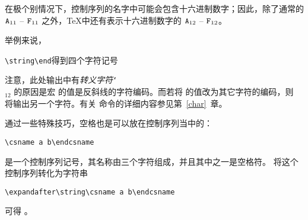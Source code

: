 \documentclass{book}
\begin{document}
在极个别情况下，控制序列的名字中可能会包含十六进制数字；因此，除了通常的 $ \text{{\tt A}}_{11} $ -- $ \text{{\tt F}}_{11} $ 之外，\TeX 中还有表示十六进制数字的 $ \text{{\tt A}}_{12} $ -- $ \text{{\tt F}}_{12} $。

举例来说，
\begin{disp}\verb>\string\end>\quad 得到四个字符记号 \quad{} \end{disp}
注意，此处输出中有\emph{转义字符}\texttt{\char`\\}$_{12}$\label{use:escape} 的原因是宏  的值是反斜线的字符编码。而若将  的值改为其它字符的编码，则  将输出另一个字符。有关  命令的详细内容参见第~\ref{char}~章。

通过一些特殊技巧，空格也是可以放在控制序列当中的：
\begin{disp}\verb>\csname a b\endcsname>\end{disp}
是一个控制序列记号，其名称由三个字符组成，并且其中之一是空格符。
将这个控制序列转化为字符串
\begin{disp}\verb>\expandafter\string\csname a b\endcsname>\end{disp}
可得 。
\end{document}
